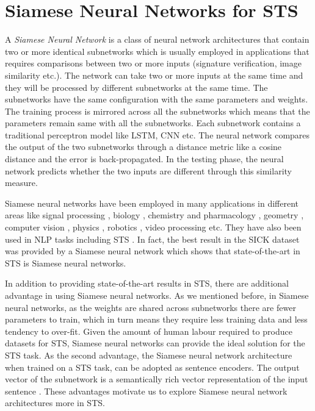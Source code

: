 \chapter{\label{cha:sts_siamese_neural_networks}Siamese Neural Networks for STS}

A \textit{Siamese Neural Network} is a class of neural network architectures that contain two or more identical subnetworks which is usually employed in applications that requires comparisons between two or more inputs (signature verification, image similarity etc.). The network can take two or more inputs at the same time and they will be processed by different subnetworks at the same time. The subnetworks have the same configuration with the same parameters and weights. The training process is mirrored across all the subnetworks which means that the parameters remain same with all the subnetworks. Each subnetwork contains a traditional perceptron model like LSTM, CNN etc. The neural network compares the output of the two subnetworks through a distance metric like a cosine distance and the error is back-propagated. In the testing phase, the neural network predicts whether the two inputs are different through this similarity measure. 

Siamese neural networks have been employed in many applications in different areas like signal processing \cite{thiolliere2015hybrid, 8461524, 8268960, 8453811, 10.1007/978-3-319-66429-3_11, 8064706, 8268994, Zeghidour2016}, biology \cite{10.1093/bioinformatics/bty887, Szubert2019}, chemistry and pharmacology \cite{10.1093/bioinformatics/btz411}, geometry \cite{10.1093/jcde/qwaa003}, computer vision  \cite{6797067,1467314,rs10020355,21be1428c6a44fb7a32d49ba83126bcb,6976727,6636646,Taigman_2014_CVPR,7163112,8269987,HANIF201954}, physics \cite{Zou18, DEBAETS2019645}, robotics \cite{Utkin2017, 7970671, 8461044}, video processing \cite{AAAI1816790, 8036238, Liu2018, 8587153} etc. They have also been used in NLP tasks \cite{10.5555/2018936.2018965,10.1145/3209978.3210144,Gonzalez2019} including STS \cite{das-etal-2016-together, neculoiu-etal-2016-learning, Mueller_Thyagarajan_2016}. In fact, the best result in the SICK dataset \cite{marelli-etal-2014-semeval} was provided by a Siamese neural network \cite{Mueller_Thyagarajan_2016} which shows that state-of-the-art in STS is Siamese neural networks. 

In addition to providing state-of-the-art results in STS, there are additional advantage in using Siamese neural networks. As we mentioned before, in Siamese neural networks, as the weights are shared across subnetworks there are fewer parameters to train, which in turn means they require less training data and less tendency to over-fit. Given the amount of human labour required to produce datasets for STS, Siamese neural networks can provide the ideal solution for the STS task. As the second advantage, the Siamese neural network architecture when trained on a STS task, can be adopted as sentence encoders. The output vector of the subnetwork is a semantically rich vector representation of the input sentence \cite{Mueller_Thyagarajan_2016}. These advantages motivate us to explore Siamese neural network architectures more in STS. 


